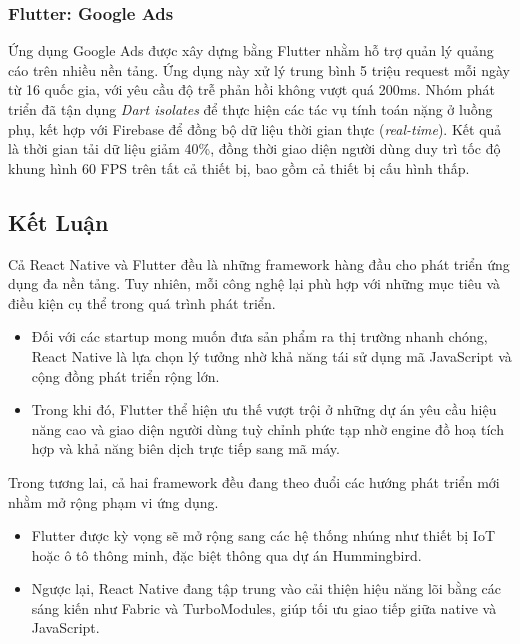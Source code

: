 \subsubsection{Flutter: Google Ads}

  Ứng dụng Google Ads được xây dựng bằng Flutter nhằm hỗ trợ quản lý quảng cáo trên nhiều nền tảng. Ứng dụng này xử lý trung bình 5 triệu request mỗi ngày từ 16 quốc gia, với yêu cầu độ trễ phản hồi không vượt quá 200ms. Nhóm phát triển đã tận dụng \textit{Dart isolates} để thực hiện các tác vụ tính toán nặng ở luồng phụ, kết hợp với Firebase để đồng bộ dữ liệu thời gian thực (\textit{real-time}). Kết quả là thời gian tải dữ liệu giảm 40\%, đồng thời giao diện người dùng duy trì tốc độ khung hình 60 FPS trên tất cả thiết bị, bao gồm cả thiết bị cấu hình thấp.

\subsection{Kết Luận}
\renewcommand{\labelitemi}{--}    

  Cả React Native và Flutter đều là những framework hàng đầu cho phát triển ứng dụng đa nền tảng. Tuy nhiên, mỗi công nghệ lại phù hợp với những mục tiêu và điều kiện cụ thể trong quá trình phát triển.
  
  \setlength{\leftmargini}{1.5cm}
  \begin{itemize}
    \item Đối với các startup mong muốn đưa sản phẩm ra thị trường nhanh chóng, React Native là lựa chọn lý tưởng nhờ khả năng tái sử dụng mã JavaScript và cộng đồng phát triển rộng lớn.
    \item Trong khi đó, Flutter thể hiện ưu thế vượt trội ở những dự án yêu cầu hiệu năng cao và giao diện người dùng tuỳ chỉnh phức tạp nhờ engine đồ hoạ tích hợp và khả năng biên dịch trực tiếp sang mã máy.
  \end{itemize}
\vspace{0.5em}


  Trong tương lai, cả hai framework đều đang theo đuổi các hướng phát triển mới nhằm mở rộng phạm vi ứng dụng.

  \setlength{\leftmargini}{1.5cm}
  \begin{itemize}
    \item Flutter được kỳ vọng sẽ mở rộng sang các hệ thống nhúng như thiết bị IoT hoặc ô tô thông minh, đặc biệt thông qua dự án Hummingbird.
    \item Ngược lại, React Native đang tập trung vào cải thiện hiệu năng lõi bằng các sáng kiến như Fabric và TurboModules, giúp tối ưu giao tiếp giữa native và JavaScript.
  \end{itemize}
\vspace{0.5em}



